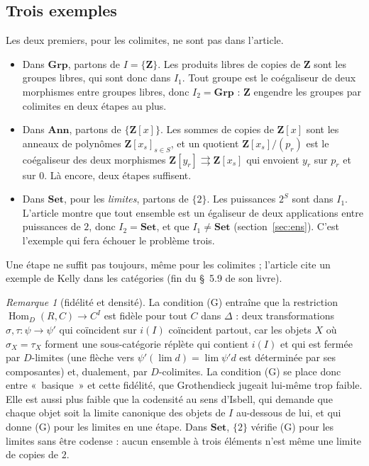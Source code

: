 \documentclass[11pt,a4paper]{amsart}
\theoremstyle{definition}
\theoremstyle{plain}
\theoremstyle{remark}
\newtheorem{remarque}{Remarque}
\newcommand{\Set}{\mathbf{Set}}
\newcommand{\Grp}{\mathbf{Grp}}
\newcommand{\Ann}{\mathbf{Ann}}
\newcommand{\Hom}{\operatorname{Hom}}
\begin{document}
\subsection*{Trois exemples}

Les deux premiers, pour les colimites, ne sont pas dans l'article.
\begin{itemize}
\item Dans $\Grp$, partons de $I=\{\mathbf Z\}$. Les produits libres de copies de $\mathbf Z$ sont les groupes libres, qui sont donc dans $I_1$. Tout groupe est le coégaliseur de deux morphismes entre groupes libres, donc $I_2=\Grp$ : $\mathbf Z$ engendre les groupes par colimites en deux étapes au plus.
\item Dans $\Ann$, partons de $\{\mathbf Z[x]\}$. Les sommes de copies de $\mathbf Z[x]$ sont les anneaux de polynômes $\mathbf Z[x_s]_{s\in S}$, et un quotient $\mathbf Z[x_s]/(p_r)$ est le coégaliseur des deux morphismes $\mathbf Z[y_r]\rightrightarrows\mathbf Z[x_s]$ qui envoient $y_r$ sur $p_r$ et sur $0$. Là encore, deux étapes suffisent.
\item Dans $\Set$, pour les \emph{limites}, partons de $\{2\}$. Les puissances $2^S$ sont dans $I_1$. L'article montre que tout ensemble est un égaliseur de deux applications entre puissances de $2$, donc $I_2=\Set$, et que $I_1\ne\Set$ (section~\ref{sec:ens}). C'est l'exemple qui fera échouer le problème trois.
\end{itemize}
Une étape ne suffit pas toujours, même pour les colimites ; l'article cite un exemple de Kelly dans les catégories (fin du §~5.9 de son livre).

\begin{remarque}[fidélité et densité]
La condition (G) entraîne que la restriction $\Hom_D(R,C)\to C^I$ est fidèle pour tout $C$ dans $\Delta$ : deux transformations $\sigma,\tau\colon\psi\to\psi'$ qui coïncident sur $i(I)$ coïncident partout, car les objets $X$ où $\sigma_X=\tau_X$ forment une sous-catégorie réplète qui contient $i(I)$ et qui est fermée par $D$-limites (une flèche vers $\psi'(\lim d)=\lim\psi'd$ est déterminée par ses composantes) et, dualement, par $D$-colimites. La condition (G) se place donc entre «~basique~» et cette fidélité, que Grothendieck jugeait lui-même trop faible. Elle est aussi plus faible que la codensité au sens d'Isbell, qui demande que chaque objet soit la limite canonique des objets de $I$ au-dessous de lui, et qui donne (G) pour les limites en une étape. Dans $\Set$, $\{2\}$ vérifie (G) pour les limites sans être codense : aucun ensemble à trois éléments n'est même une limite de copies de $2$.
\end{remarque}
\end{document}
